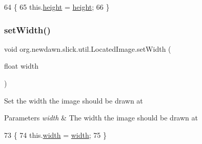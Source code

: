 \begin{DoxyCode}
64                                         \{
65         this.\mbox{\hyperlink{classorg_1_1newdawn_1_1slick_1_1util_1_1_located_image_abeb19801d483aa7fdd249c15c535edaf}{height}} = \mbox{\hyperlink{classorg_1_1newdawn_1_1slick_1_1util_1_1_located_image_abeb19801d483aa7fdd249c15c535edaf}{height}};
66     \}
\end{DoxyCode}
\mbox{\label{classorg_1_1newdawn_1_1slick_1_1util_1_1_located_image_a82d5cbd11861271e437677a62e9ed143}} 
\subsubsection{\texorpdfstring{set\+Width()}{setWidth()}}
{\footnotesize\ttfamily void org.\+newdawn.\+slick.\+util.\+Located\+Image.\+set\+Width (\begin{DoxyParamCaption}\item[{float}]{width }\end{DoxyParamCaption})\hspace{0.3cm}{\ttfamily [inline]}}

Set the width the image should be drawn at


\begin{DoxyParams}{Parameters}
{\em width} & The width the image should be drawn at \\
\hline
\end{DoxyParams}

\begin{DoxyCode}
73                                       \{
74         this.\mbox{\hyperlink{classorg_1_1newdawn_1_1slick_1_1util_1_1_located_image_a26063411818a274d3ce90c93185e44ac}{width}} = \mbox{\hyperlink{classorg_1_1newdawn_1_1slick_1_1util_1_1_located_image_a26063411818a274d3ce90c93185e44ac}{width}};
75     \}
\end{DoxyCode}
\mbox{\label{classorg_1_1newdawn_1_1slick_1_1util_1_1_located_image_ad22fa6b42e4aae771d17f38ad7c59685}} 
